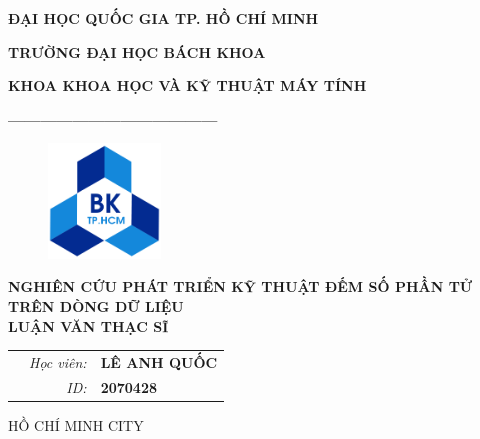 \documentclass[a4paper,13pt]{article}
\theoremstyle{mytheor}
\begin{document}
\begin{titlepage}
\begin{center} {\textbf{ĐẠI HỌC QUỐC GIA TP. HỒ CHÍ MINH}
}

{\textbf{TRƯỜNG ĐẠI HỌC BÁCH KHOA}
}

{\textbf{KHOA KHOA HỌC VÀ KỸ THUẬT MÁY TÍNH }
}

{\textbf{---------------------------------------}}

\end{center}

\vspace{1cm}

\begin{figure}[h!]
\begin{center}
\includegraphics[width=3cm]{hcmut.png}
\end{center}
\end{figure}

\vspace{2cm}


\begin{center}
\textbf{\Large NGHIÊN CỨU PHÁT TRIỂN KỸ THUẬT ĐẾM SỐ PHẦN TỬ \\TRÊN DÒNG DỮ LIỆU}
\vspace{1.5cm}
\\
\textbf{\Large LUẬN VĂN THẠC SĨ}
\end{center}

\vspace{3cm}

\begin{table}[h]
\begin{tabular}{rrl}
\hspace{5.1cm} 
&\textit{Học viên: } & \textbf{LÊ ANH QUỐC}\\
&\textit{ID: } & \textbf{2070428}\\

\end{tabular}
\end{table}
\vspace{3cm}
\begin{center}
{\footnotesize HỒ CHÍ MINH CITY}
\end{center}
\end{titlepage}
\end{document}
